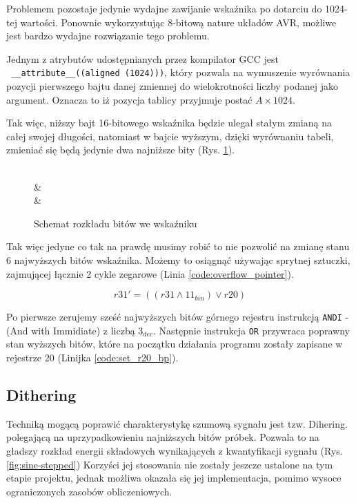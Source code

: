 \documentclass[12pt, a4paper]{article}
\begin{document}
Problemem pozostaje jedynie wydajne zawijanie wskaźnika po dotarciu do 1024-tej wartości.
Ponownie wykorzystując 8-bitową nature układów AVR, możliwe jest bardzo wydajne rozwiązanie tego problemu.

Jednym z atrybutów udostępnianych przez kompilator GCC jest\\
\verb| __attribute__((aligned (1024)))|, który pozwala na wymuszenie
wyrównania pozycji pierwszego bajtu danej zmiennej do wielokrotności liczby podanej jako argument.
Oznacza to iż pozycja tablicy przyjmuje postać $A \times 1024$.

Tak więc, niższy bajt 16-bitowego wskaźnika będzie ulegał stałym zmianą na całej swojej długości,
natomiast w bajcie wyższym, dzięki wyrównaniu tabeli, zmieniać się będą jedynie dwa najniższe bity (Rys. \ref{fig:bits_ex}).

\begin{figure}[h]
	\centering
	\hfill

	\begin{bytefield}[bitwidth=7mm,endianness=big]{16}
		 \\
		 & \\
		 & \\
	\end{bytefield}
	\caption{Schemat rozkładu bitów we wskaźniku}
	\label{fig:bits_ex}
\end{figure}

Tak więc jedyne co tak na prawdę musimy robić to nie pozwolić na zmianę stanu 6 najwyższych bitów wskaźnika.
Możemy to osiągnąć używając sprytnej sztuczki, zajmującej łącznie 2 cykle zegarowe (Linia \ref{code:overflow_pointer}).

\begin{equation}
	r31' = \left( \left( r31 \land 11_{bin} \right) \lor r20 \right)
\end{equation}

Po pierwsze zerujemy sześć najwyższych bitów górnego rejestru instrukcją \verb|ANDI| - (And with Immidiate) z liczbą $3_{dec}$.
Następnie instrukcja \verb|OR| przywraca poprawny stan wyższych bitów, 
które na początku działania programu zostały zapisane w rejestrze 20 (Linijka \ref{code:set_r20_bp}).


\iffalse
\subsection{Dithering}
Techniką mogącą poprawić charakterystykę szumową sygnału jest tzw. Dihering. polegającą na uprzypadkowieniu najniższych bitów próbek.
Pozwala to na gładszy rozkład energii składowych wynikających z kwantyfikacji sygnału (Rys. \ref{fig:sine-stepped})
Korzyści jej stosowania nie zostały jeszcze ustalone na tym etapie projektu, jednak możliwa okazała się jej implementacja,
pomimo wysoce ograniczonych zasobów obliczeniowych.
\end{document}
